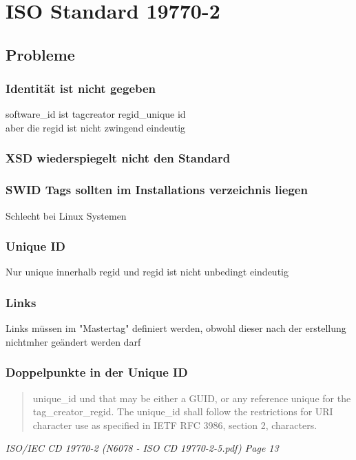 \section{ISO Standard 19770-2} 

\subsection{Probleme}

\subsubsection{Identität ist nicht gegeben}
software\_id ist tagcreator regid\_unique id\\
aber die regid ist nicht zwingend eindeutig

\subsubsection{XSD wiederspiegelt nicht den Standard}

\subsubsection{SWID Tags sollten im Installations verzeichnis liegen}
Schlecht bei Linux Systemen

\subsubsection{Unique ID}
Nur unique innerhalb regid und regid ist nicht unbedingt eindeutig

\subsubsection{Links}
Links müssen im "Mastertag" definiert werden, obwohl dieser nach der erstellung
nichtmher geändert werden darf


\subsubsection{Doppelpunkte in der Unique ID} 
\begin{quote}
unique\_id und that may
be either a GUID, or any reference unique for the tag\_creator\_regid. The
unique\_id shall follow the restrictions for URI character use as specified in
IETF RFC 3986, section 2, characters. 
\end{quote} 
\textit{ISO/IEC CD 19770-2 (N6078 - ISO CD 19770-2-5.pdf) Page 13}

